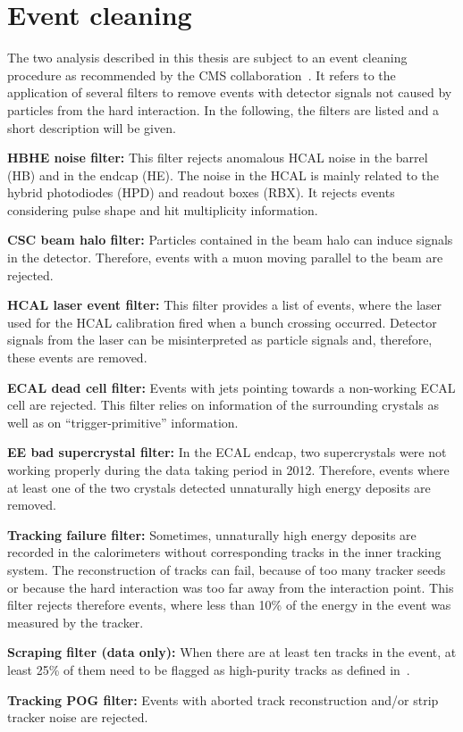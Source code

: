 \section{Event cleaning}
The two analysis described in this thesis are subject to an event cleaning procedure as recommended by the CMS collaboration~\cite{bib:CMS:EventCleaning}.
It refers to the application of several filters to remove events with detector signals not caused by particles from the hard interaction. 
In the following, the filters are listed and a short description will be given.
\begin{description} 
\item \textbf{HBHE noise filter:} This filter rejects anomalous HCAL noise in the barrel (HB) and in the endcap (HE). The noise in the HCAL is mainly related to the hybrid photodiodes (HPD) and readout boxes (RBX). It rejects events considering pulse shape and hit multiplicity information.
\item \textbf{CSC beam halo filter:} Particles contained in the beam halo can induce signals in the detector. Therefore, events with a muon moving parallel to the beam are rejected.  
\item \textbf{HCAL laser event filter:} This filter provides a list of events, where the laser used for the HCAL calibration fired when a bunch crossing occurred. Detector signals from the laser can be misinterpreted as particle signals and, therefore, these events are removed.
\item \textbf{ECAL dead cell filter:} Events with jets pointing towards a non-working ECAL cell are rejected. This filter relies on information of the surrounding crystals as well as on ``trigger-primitive'' information.
\item \textbf{EE bad supercrystal filter:} In the ECAL endcap, two supercrystals were not working properly during the data taking period in 2012. Therefore, events where at least one of the two crystals detected unnaturally high energy deposits are removed. 
\item \textbf{Tracking failure filter:} Sometimes, unnaturally high energy deposits are recorded in the calorimeters without corresponding tracks in the inner tracking system. The reconstruction of tracks can fail, because of too many tracker seeds or because the hard interaction was too far away from the interaction point.
This filter rejects therefore events, where less than 10\% of the energy in the event was measured by the tracker.  
\item \textbf{Scraping filter (data only):} When there are at least ten tracks in the event, at least 25\% of them need to be flagged as high-purity tracks as defined in~\cite{bib:CMS:Tracking_2010}.
\item \textbf{Tracking POG filter:} Events with aborted track reconstruction and/or strip tracker noise are rejected.
\end{description}



